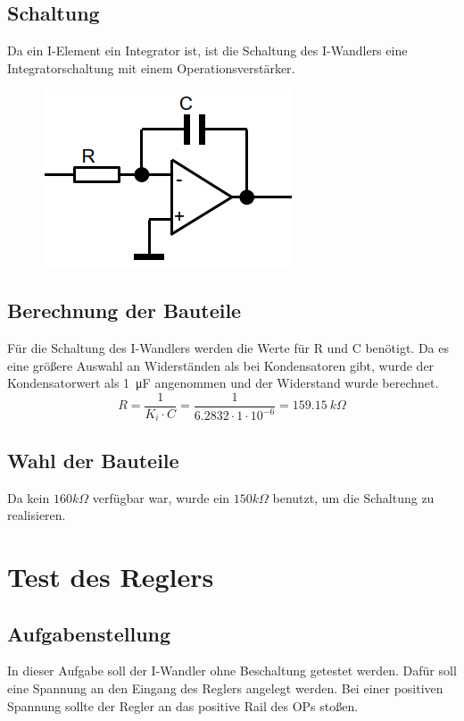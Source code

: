 \documentclass[twoside]{article}
\begin{document}
\subsection{Schaltung}
Da ein I-Element ein Integrator ist, ist die Schaltung des I-Wandlers eine Integratorschaltung mit einem Operationsverstärker.
\begin{figure}[h]
    \centering
    \includegraphics[width=1\linewidth]{img/Schaltung_01.png}
\end{figure}

\subsection{Berechnung der Bauteile}
Für die Schaltung des I-Wandlers werden die Werte für R und C benötigt. Da es eine größere Auswahl an Widerständen als bei Kondensatoren gibt, wurde der Kondensatorwert als \SI{1}{\micro\farad} angenommen und der Widerstand wurde berechnet.
\begin{equation}
R=\frac{1}{K_i \cdot C} = \frac{1}{6.2832 \cdot 1\cdot 10^{-6}}=159.15\ k\Omega
\end{equation}

\subsection{Wahl der Bauteile}
Da kein $160k\Omega$ verfügbar war, wurde ein $150k\Omega$ benutzt, um die Schaltung zu realisieren.
\newpage
\section{Test des Reglers}
\subsection{Aufgabenstellung}
In dieser Aufgabe soll der I-Wandler ohne Beschaltung getestet werden. Dafür soll eine Spannung an den Eingang des Reglers angelegt werden. Bei einer positiven Spannung sollte der Regler an das positive Rail des OPs stoßen.
\end{document}
